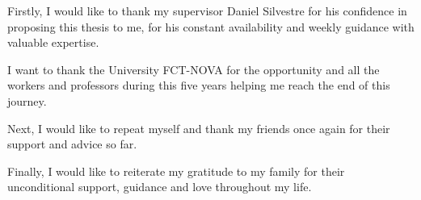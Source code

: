 
%

\begin{ntacknowledgements}

Firstly, I would like to thank my supervisor Daniel Silvestre for his confidence in proposing this thesis to me, for his constant availability and weekly guidance with valuable expertise. \par
I want to thank the University FCT-NOVA for the opportunity and all the workers and professors during this five years helping me reach the end of this journey.\par
Next, I would like to repeat myself and thank my friends once again for their support and advice so far. \par
Finally, I would like to reiterate my gratitude to my family for their unconditional support, guidance and love throughout my life.

\end{ntacknowledgements}